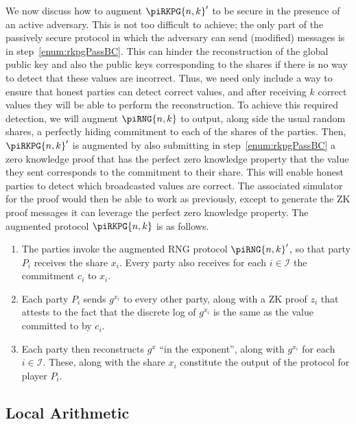 \documentclass{article}
\theoremstyle{remark}
\begin{document}
We now discuss how to augment ${\piRKPG{n,k}}'$ to be secure in the presence of
an active adversary. This is not too difficult to achieve; the only part of the
passively secure protocol in which the adversary can send (modified) messages
is in step~\ref{enum:rkpgPassBC}. This can hinder the reconstruction of the
global public key and also the public keys corresponding to the shares if there
is no way to detect that these values are incorrect. Thus, we need only include
a way to ensure that honest parties can detect correct values, and after
receiving $k$ correct values they will be able to perform the reconstruction.
To achieve this required detection, we will augment $\piRNG{n,k}$ to output,
along side the usual random shares, a perfectly hiding commitment to each of
the shares of the parties. Then, ${\piRKPG{n,k}}'$ is augmented by also
submitting in step~\ref{enum:rkpgPassBC} a zero knowledge proof that has the
perfect zero knowledge property that the value they sent corresponds to the
commitment to their share. This will enable honest parties to detect which
broadcasted values are correct. The associated simulator for the proof would
then be able to work as previously, except to generate the ZK proof messages it
can leverage the perfect zero knowledge property. The augmented protocol
$\piRKPG{n,k}$ is as follows.

\begin{enumerate}
	\item The parties invoke the augmented RNG protocol ${\piRNG{n,k}}'$, so
		that party $P_i$ receives the share $x_i$. Every party also receives
		for each $i \in \mathcal{I}$ the commitment $c_i$ to $x_i$.

	\item Each party $P_i$ sends $g^{x_i}$ to every other party, along with a
		ZK proof $z_i$ that attests to the fact that the discrete log of
		$g^{x_i}$ is the same as the value committed to by $c_i$.

	\item Each party then reconstructs $g^x$ ``in the exponent'', along with
		$g^{x_i}$ for each $i \in \mathcal{I}$. These, along with the share
		$x_i$ constitute the output of the protocol for player $P_i$.
\end{enumerate}

\subsection{Local Arithmetic}
\end{document}
